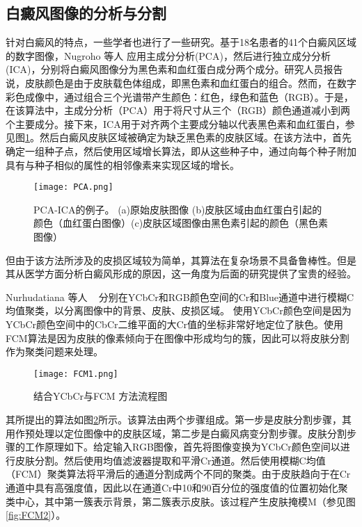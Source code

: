 \subsection{白癜风图像的分析与分割}
针对白癜风的特点，一些学者也进行了一些研究。基于18名患者的41个白癜风区域的数字图像，Nugroho 等人 \cite {nugroho2013computerised}应用主成分分析(PCA)，然后进行独立成分分析(ICA)，分别将白癜风图像分为黑色素和血红蛋白成分两个成分。研究人员报告说，皮肤颜色是由于皮肤载色体组成，即黑色素和血红蛋白的组合。然而，在数字彩色成像中，通过组合三个光谱带产生颜色：红色，绿色和蓝色（RGB）。于是，在该算法中，主成分分析（PCA）用于将尺寸从三个（RGB）颜色通道减小到两个主要成分。接下来，ICA用于对齐两个主要成分轴以代表黑色素和血红蛋白，参见图\ref{fig:PCA}。然后白癜风皮肤区域被确定为缺乏黑色素的皮肤区域。在该方法中，首先确定一组种子点，然后使用区域增长算法，即从这些种子中，通过向每个种子附加具有与种子相似的属性的相邻像素来实现区域的增长。

\begin{figure}[htbp]
\begin{center}
\texttt{[image: PCA.png]}
\end{center}
\caption{PCA-ICA的例子。 (a)原始皮肤图像 (b)皮肤区域由血红蛋白引起的颜色（血红蛋白图像）(c)皮肤区域图像由黑色素引起的颜色（黑色素图像）}
\label{fig:PCA}
\end{figure}

但由于该方法所涉及的皮损区域较为简单，其算法在复杂场景不具备鲁棒性。但是其从医学方面分析白癜风形成的原因，这一角度为后面的研究提供了宝贵的经验。

Nurhudatiana 等人 ~ \cite {nurhudatiana2015computer}分别在YCbCr和RGB颜色空间的Cr和Blue通道中进行模糊C均值聚类，以分离图像中的背景、皮肤、皮损区域。 使用YCbCr颜色空间是因为YCbCr颜色空间中的CbCr二维平面的大Cr值的坐标非常好地定位了肤色。使用FCM算法是因为皮肤的像素倾向于在图像中形成均匀的簇，因此可以将皮肤分割作为聚类问题来处理。

\begin{figure}[htbp]
\begin{center}
\texttt{[image: FCM1.png]}
\end{center}
\caption{结合YCbCr与FCM 方法流程图 \cite {nurhudatiana2015computer}}
\label{fig:FCM1}
\end{figure}

其所提出的算法如图\ref{fig:FCM1}所示。该算法由两个步骤组成。第一步是皮肤分割步骤，其用作预处理以定位图像中的皮肤区域，第二步是白癜风病变分割步骤。皮肤分割步骤的工作原理如下。给定输入RGB图像，首先将图像变换为YCbCr颜色空间以进行皮肤分割。然后使用均值滤波器提取和平滑Cr通道。然后使用模糊C均值（FCM）聚类算法将平滑后的通道分割成两个不同的聚类。由于皮肤趋向于在Cr通道中具有高强度值，因此以在通道Cr中10和90百分位的强度值的位置初始化聚类中心，其中第一簇表示背景，第二簇表示皮肤。该过程产生皮肤掩模M（参见图\ref{fig:FCM2}）。

